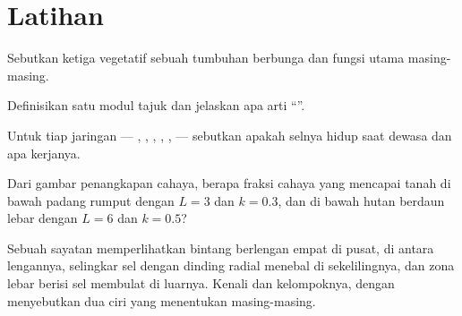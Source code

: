 \section{Latihan}

\begin{exercise}[$\star$]\label{exo:b1:flowering-plant-organization:1}
Sebutkan ketiga  vegetatif sebuah tumbuhan berbunga dan fungsi
utama masing-masing.
\end{exercise}

\begin{exercise}[$\star$]\label{exo:b1:flowering-plant-organization:2}
Definisikan satu modul tajuk dan jelaskan apa arti ``''.
\end{exercise}

\begin{exercise}[$\star$]\label{exo:b1:flowering-plant-organization:3}
Untuk tiap jaringan --- , , , ,
,  --- sebutkan apakah selnya hidup saat dewasa dan apa
kerjanya.
\end{exercise}

\begin{exercise}[$\star$]\label{exo:b1:flowering-plant-organization:4}
Dari gambar penangkapan cahaya, berapa fraksi cahaya yang mencapai
tanah di bawah padang rumput dengan $L = 3$ dan $k = 0.3$, dan di bawah
hutan berdaun lebar dengan $L = 6$ dan $k = 0.5$?
\end{exercise}

\begin{exercise}[$\star\star$]\label{exo:b1:flowering-plant-organization:5}
Sebuah sayatan memperlihatkan bintang  berlengan empat di pusat,
 di antara lengannya, selingkar sel dengan dinding radial menebal
di sekelilingnya, dan zona lebar berisi sel membulat di luarnya.
Kenali  dan kelompoknya, dengan menyebutkan dua ciri yang
menentukan masing-masing.
\end{exercise}

